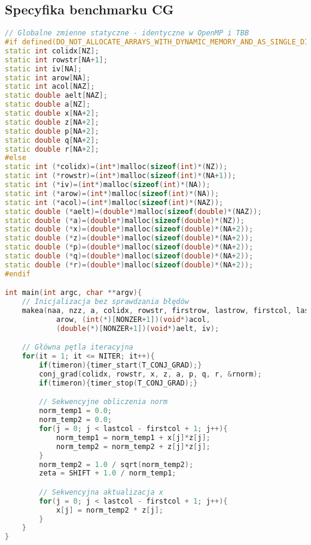 \subsection{Specyfika benchmarku CG}
\begin{lstlisting}[language=C++, caption={Implementacja benchmarku CG w języku C++ z OpenMP}, label={lst:cg_openmp}]
// Globalne zmienne statyczne - identyczne w OpenMP i TBB
#if defined(DO_NOT_ALLOCATE_ARRAYS_WITH_DYNAMIC_MEMORY_AND_AS_SINGLE_DIMENSION)
static int colidx[NZ];
static int rowstr[NA+1];
static int iv[NA];
static int arow[NA];
static int acol[NAZ];
static double aelt[NAZ];
static double a[NZ];
static double x[NA+2];
static double z[NA+2];
static double p[NA+2];
static double q[NA+2];
static double r[NA+2];
#else
static int (*colidx)=(int*)malloc(sizeof(int)*(NZ));
static int (*rowstr)=(int*)malloc(sizeof(int)*(NA+1));
static int (*iv)=(int*)malloc(sizeof(int)*(NA));
static int (*arow)=(int*)malloc(sizeof(int)*(NA));
static int (*acol)=(int*)malloc(sizeof(int)*(NAZ));
static double (*aelt)=(double*)malloc(sizeof(double)*(NAZ));
static double (*a)=(double*)malloc(sizeof(double)*(NZ));
static double (*x)=(double*)malloc(sizeof(double)*(NA+2));
static double (*z)=(double*)malloc(sizeof(double)*(NA+2));
static double (*p)=(double*)malloc(sizeof(double)*(NA+2));
static double (*q)=(double*)malloc(sizeof(double)*(NA+2));
static double (*r)=(double*)malloc(sizeof(double)*(NA+2));
#endif

int main(int argc, char **argv){
    // Inicjalizacja bez sprawdzania błędów
    makea(naa, nzz, a, colidx, rowstr, firstrow, lastrow, firstcol, lastcol, 
            arow, (int(*)[NONZER+1])(void*)acol, 
            (double(*)[NONZER+1])(void*)aelt, iv);

    // Główna pętla iteracyjna
    for(it = 1; it <= NITER; it++){
        if(timeron){timer_start(T_CONJ_GRAD);}
        conj_grad(colidx, rowstr, x, z, a, p, q, r, &rnorm);
        if(timeron){timer_stop(T_CONJ_GRAD);}

        // Sekwencyjne obliczenia norm
        norm_temp1 = 0.0;
        norm_temp2 = 0.0;
        for(j = 0; j < lastcol - firstcol + 1; j++){
            norm_temp1 = norm_temp1 + x[j]*z[j];
            norm_temp2 = norm_temp2 + z[j]*z[j];
        }
        norm_temp2 = 1.0 / sqrt(norm_temp2);
        zeta = SHIFT + 1.0 / norm_temp1;

        // Sekwencyjna aktualizacja x
        for(j = 0; j < lastcol - firstcol + 1; j++){
            x[j] = norm_temp2 * z[j];
        }
    }
}


\end{lstlisting}
